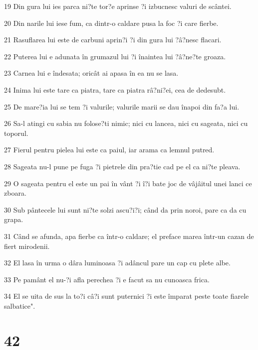 \par 19 Din gura lui ies parca ni?te tor?e aprinse ?i izbucnesc valuri de scântei.
\par 20 Din narile lui iese fum, ca dintr-o caldare pusa la foc ?i care fierbe.
\par 21 Rasuflarea lui este de carbuni aprin?i ?i din gura lui ?â?nesc flacari.
\par 22 Puterea lui e adunata în grumazul lui ?i înaintea lui ?â?ne?te groaza.
\par 23 Carnea lui e îndesata; oricât ai apasa în ea nu se lasa.
\par 24 Inima lui este tare ca piatra, tare ca piatra râ?ni?ei, cea de dedesubt.
\par 25 De mare?ia lui se tem ?i valurile; valurile marii se dau înapoi din fa?a lui.
\par 26 Sa-l atingi cu sabia nu folose?ti nimic; nici cu lancea, nici cu sageata, nici cu toporul.
\par 27 Fierul pentru pielea lui este ca paiul, iar arama ca lemnul putred.
\par 28 Sageata nu-l pune pe fuga ?i pietrele din pra?tie cad pe el ca ni?te pleava.
\par 29 O sageata pentru el este un pai în vânt ?i î?i bate joc de vâjâitul unei lanci ce zboara.
\par 30 Sub pântecele lui sunt ni?te solzi ascu?i?i; când da prin noroi, pare ca da cu grapa.
\par 31 Când se afunda, apa fierbe ca într-o caldare; el preface marea într-un cazan de fiert mirodenii.
\par 32 El lasa în urma o dâra luminoasa ?i adâncul pare un cap cu plete albe.
\par 33 Pe pamânt el nu-?i afla perechea ?i e facut sa nu cunoasca frica.
\par 34 El se uita de sus la to?i câ?i sunt puternici ?i este împarat peste toate fiarele salbatice".

\chapter{42}

